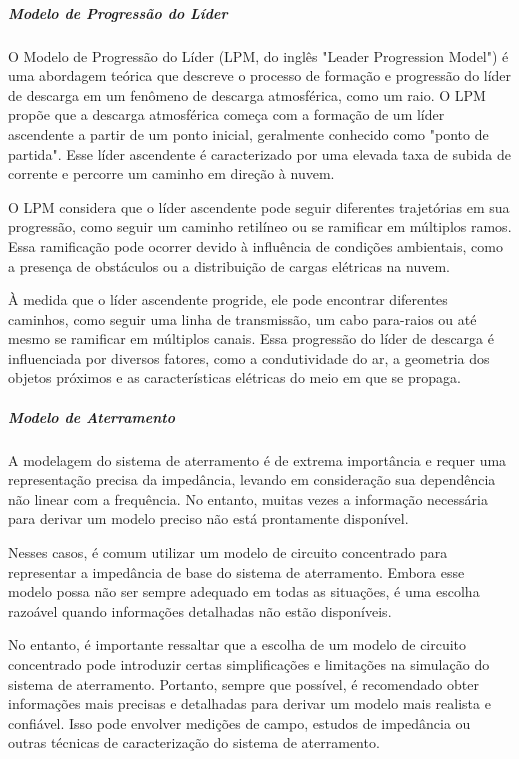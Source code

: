 \documentclass[a4paper, 12pt, onecolumn,singlespacing]{article}
\begin{document}
	\subparagraph{Modelo de Progressão do Líder} O Modelo de Progressão do Líder (LPM, do inglês "Leader Progression Model") é uma abordagem teórica que descreve o processo de formação e progressão do líder de descarga em um fenômeno de descarga atmosférica, como um raio. O LPM propõe que a descarga atmosférica começa com a formação de um líder ascendente a partir de um ponto inicial, geralmente conhecido como "ponto de partida". Esse líder ascendente é caracterizado por uma elevada taxa de subida de corrente e percorre um caminho em direção à nuvem.
	
	O LPM considera que o líder ascendente pode seguir diferentes trajetórias em sua progressão, como seguir um caminho retilíneo ou se ramificar em múltiplos ramos. Essa ramificação pode ocorrer devido à influência de condições ambientais, como a presença de obstáculos ou a distribuição de cargas elétricas na nuvem.
	
	À medida que o líder ascendente progride, ele pode encontrar diferentes caminhos, como seguir uma linha de transmissão, um cabo para-raios ou até mesmo se ramificar em múltiplos canais. Essa progressão do líder de descarga é influenciada por diversos fatores, como a condutividade do ar, a geometria dos objetos próximos e as características elétricas do meio em que se propaga.
	
	\subparagraph{Modelo de Aterramento}
	
	A modelagem do sistema de aterramento é de extrema importância e requer uma representação precisa da impedância, levando em consideração sua dependência não linear com a frequência. No entanto, muitas vezes a informação necessária para derivar um modelo preciso não está prontamente disponível.
	
	Nesses casos, é comum utilizar um modelo de circuito concentrado para representar a impedância de base do sistema de aterramento. Embora esse modelo possa não ser sempre adequado em todas as situações, é uma escolha razoável quando informações detalhadas não estão disponíveis.
	
	No entanto, é importante ressaltar que a escolha de um modelo de circuito concentrado pode introduzir certas simplificações e limitações na simulação do sistema de aterramento. Portanto, sempre que possível, é recomendado obter informações mais precisas e detalhadas para derivar um modelo mais realista e confiável. Isso pode envolver medições de campo, estudos de impedância ou 
	outras técnicas de caracterização do sistema de aterramento.
	
\end{document}
